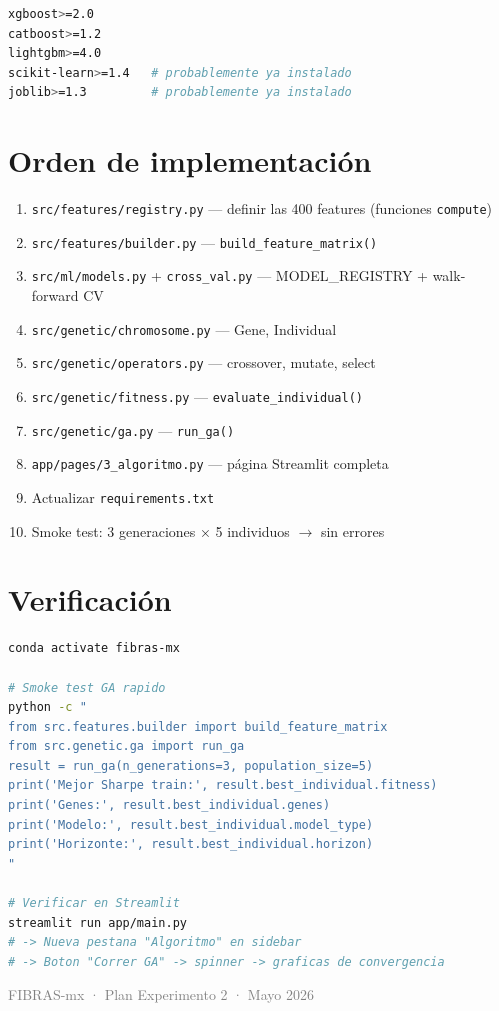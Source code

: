 \documentclass[12pt,letterpaper]{article}
\begin{document}
\begin{lstlisting}[language=bash]
xgboost>=2.0
catboost>=1.2
lightgbm>=4.0
scikit-learn>=1.4   # probablemente ya instalado
joblib>=1.3         # probablemente ya instalado
\end{lstlisting}

\section{Orden de implementación}

\begin{enumerate}[leftmargin=2em]
  \item \texttt{src/features/registry.py} — definir las 400 features (funciones \texttt{compute})
  \item \texttt{src/features/builder.py} — \texttt{build\_feature\_matrix()}
  \item \texttt{src/ml/models.py} + \texttt{cross\_val.py} — MODEL\_REGISTRY + walk-forward CV
  \item \texttt{src/genetic/chromosome.py} — Gene, Individual
  \item \texttt{src/genetic/operators.py} — crossover, mutate, select
  \item \texttt{src/genetic/fitness.py} — \texttt{evaluate\_individual()}
  \item \texttt{src/genetic/ga.py} — \texttt{run\_ga()}
  \item \texttt{app/pages/3\_algoritmo.py} — página Streamlit completa
  \item Actualizar \texttt{requirements.txt}
  \item Smoke test: 3 generaciones × 5 individuos $\to$ sin errores
\end{enumerate}

\section{Verificación}

\begin{lstlisting}[language=bash]
conda activate fibras-mx

# Smoke test GA rapido
python -c "
from src.features.builder import build_feature_matrix
from src.genetic.ga import run_ga
result = run_ga(n_generations=3, population_size=5)
print('Mejor Sharpe train:', result.best_individual.fitness)
print('Genes:', result.best_individual.genes)
print('Modelo:', result.best_individual.model_type)
print('Horizonte:', result.best_individual.horizon)
"

# Verificar en Streamlit
streamlit run app/main.py
# -> Nueva pestana "Algoritmo" en sidebar
# -> Boton "Correr GA" -> spinner -> graficas de convergencia
\end{lstlisting}

\vfill
\begin{center}
\textcolor{gray}{\small FIBRAS-mx · Plan Experimento 2 · Mayo 2026}
\end{center}
\end{document}
